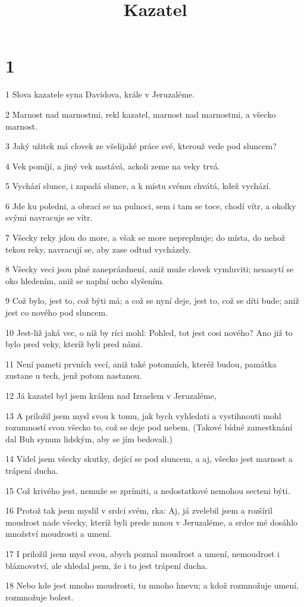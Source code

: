 

\title{Kazatel}

\chapter{1}

\par 1 Slova kazatele syna Davidova, krále v Jeruzaléme.
\par 2 Marnost nad marnostmi, rekl kazatel, marnost nad marnostmi, a všecko marnost.
\par 3 Jaký užitek má clovek ze všelijaké práce své, kterouž vede pod sluncem?
\par 4 Vek pomíjí, a jiný vek nastává, ackoli zeme na veky trvá.
\par 5 Vychází slunce, i zapadá slunce, a k místu svému chvátá, kdež vychází.
\par 6 Jde ku poledni, a obrací se na pulnoci, sem i tam se toce, chodí vítr, a okolky svými navracuje se vítr.
\par 7 Všecky reky jdou do more, a však se more nepreplnuje; do místa, do nehož tekou reky, navracují se, aby zase odtud vycházely.
\par 8 Všecky veci jsou plné zaneprázdnení, aniž muže clovek vymluviti; nenasytí se oko hledením, aniž se naplní ucho slyšením.
\par 9 Což bylo, jest to, což býti má; a což se nyní deje, jest to, což se díti bude; aniž jest co nového pod sluncem.
\par 10 Jest-liž jaká vec, o níž by ríci mohl: Pohled, tot jest cosi nového? Ano již to bylo pred veky, kteríž byli pred námi.
\par 11 Není pameti prvních vecí, aniž také potomních, kteréž budou, památka zustane u tech, jenž potom nastanou.
\par 12 Já kazatel byl jsem králem nad Izraelem v Jeruzaléme,
\par 13 A priložil jsem mysl svou k tomu, jak bych vyhledati a vystihnouti mohl rozumností svou všecko to, což se deje pod nebem. (Takové bídné zamestknání dal Buh synum lidským, aby se jím bedovali.)
\par 14 Videl jsem všecky skutky, dející se pod sluncem, a aj, všecko jest marnost a trápení ducha.
\par 15 Což krivého jest, nemuže se zprímiti, a nedostatkové nemohou secteni býti.
\par 16 Protož tak jsem myslil v srdci svém, rka: Aj, já zvelebil jsem a rozšíril moudrost nade všecky, kteríž byli prede mnou v Jeruzaléme, a srdce mé dosáhlo množství moudrosti a umení.
\par 17 I priložil jsem mysl svou, abych poznal moudrost a umení, nemoudrost i bláznovství, ale shledal jsem, že i to jest trápení ducha.
\par 18 Nebo kde jest mnoho moudrosti, tu mnoho hnevu; a kdož rozmnožuje umení, rozmnožuje bolest.

